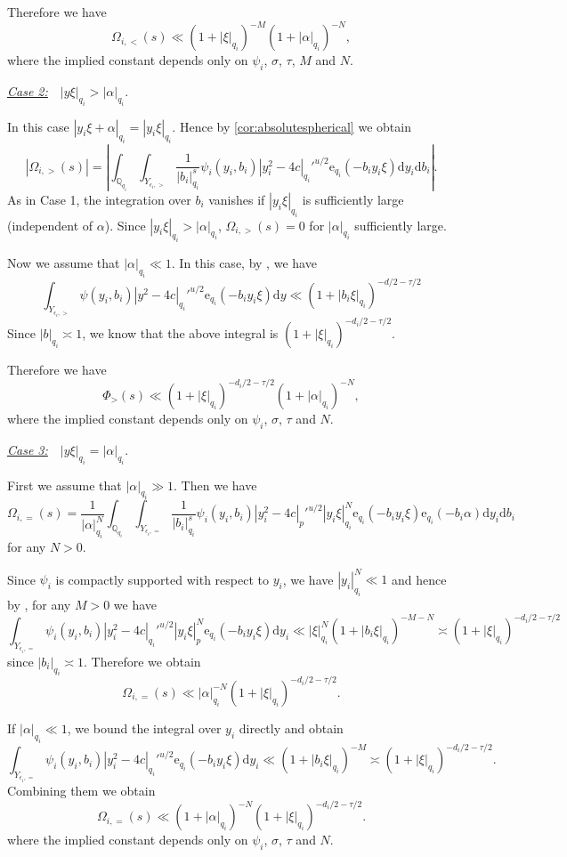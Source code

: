 \documentclass[10pt,oneside,reqno]{amsart}
\makeatletter
\newcommand\rmd{\mathrm{d}}
\newcommand\rme{\mathrm{e}}
\newcommand\QQ{\mathbb{Q}}
\theoremstyle{THEOREM}
\theoremstyle{DEFINITION}
\theoremstyle{EXERCISE}
\numberwithin{equation}{section}
\renewenvironment{proof}[1][\proofname]{\par
  \vspace{-6pt}
  \pushQED{\qed}
  \normalfont \topsep6\p@\@plus6\p@\relax
  \trivlist
  \item[\hskip\labelsep\rmfamily\bfseries
    #1\@addpunct{:}]\ignorespaces
}{
  \popQED\endtrivlist\@endpefalse
  \vspace{-6pt}
}
\newenvironment{insertproof}[1][\proofname]{\renewcommand\qedsymbol{$\blacksquare$}
  \par
  \vspace{-6pt}
  \pushQED{\qed}
  \normalfont \topsep6\p@\@plus6\p@\relax
  \trivlist
  \item[\hskip\labelsep\rmfamily\bfseries
    #1\@addpunct{:}]\ignorespaces
}{
  \popQED\endtrivlist\@endpefalse
  \vspace{-6pt}
}
\makeatother
\begin{document}
\begin{proof}
\begin{insertproof}
Therefore we have
\[
\Omega_{i,<}(s)\ll (1+|\xi|_{q_i})^{-M}(1+|\alpha|_{q_i})^{-N},
\]
where the implied constant depends only on $\psi_i$, $\sigma$, $\tau$, $M$ and $N$. 

\underline{\emph{Case 2:}}\ \ $|y\xi|_{q_i}>|\alpha|_{q_i}$.

In this case $|y_i\xi+\alpha|_{q_i}=|y_i\xi|_{q_i}$. Hence by \autoref{cor:absolutespherical} we obtain
\[
|\Omega_{i,>}(s)|=\left|\int_{\QQ_{q_i}}\int_{Y_{\epsilon_i,>}}\frac{1}{|b_i|_{q_i}^{s}} \psi_i(y_i,b_i)|y_i^2-4c|_{q_i}'^{u/2}\rme_{q_i}(-b_iy_i\xi)\rmd y_i\rmd b_i\right|.
\]
As in Case 1, the integration over $b_i$ vanishes if $|y_i\xi|_{q_i}$ is sufficiently large (independent of $\alpha$). Since $|y_i\xi|_{q_i}>|\alpha|_{q_i}$, $\Omega_{i,>}(s)=0$ for $|\alpha|_{q_i}$ sufficiently large. 

Now we assume that $|\alpha|_{q_i}\ll 1$. In this case, by \cite[Theorem A.5]{cheng2025b}, we have
\[
\int_{Y_{\epsilon_i,>}}\psi(y_i,b_i)|y^2-4c|_{q_i}'^{u/2}\rme_{q_i}(-b_iy_i\xi)\rmd y\ll (1+|b_i\xi|_{q_i})^{-d/2-\tau/2}
\]
Since $|b|_{q_i}\asymp 1$, we know that the above integral is $(1+|\xi|_{q_i})^{-d_i/2-\tau/2}$.

Therefore we have
\[
\Phi_>(s)\ll (1+|\xi|_{q_i})^{-d_i/2-\tau/2}(1+|\alpha|_{q_i})^{-N},
\]
where the implied constant depends only on $\psi_i$, $\sigma$, $\tau$ and $N$. 

\underline{\emph{Case 3:}}\ \ $|y\xi|_{q_i}=|\alpha|_{q_i}$.

First we assume that $|\alpha|_{q_i}\gg 1$. Then we have
\[
\Omega_{i,=}(s)=\frac{1}{|\alpha|_{q_i}^N}\int_{\QQ_{q_i}}\int_{Y_{\epsilon_i,=}} \frac{1}{|b_i|_{q_i}^s}\psi_i(y_i,b_i)|y_i^2-4c|_p'^{u/2} |y_i\xi|_{q_i}^N\rme_{q_i}(-b_iy_i\xi)\rme_{q_i}(-b_i\alpha)\rmd y_i\rmd b_i
\]
for any $N>0$.

Since $\psi_i$ is compactly supported with respect to $y_i$, we have $|y_i|_{q_i}^N\ll 1$ and hence by \cite[Theorem A.5]{cheng2025b}, for any $M>0$ we have
\[
\int_{Y_{\epsilon_i,=}}\psi_i(y_i,b_i)|y_i^2-4c|_{q_i}'^{u/2}|y_i\xi|_p^N\rme_{q_i}(-b_iy_i\xi)\rmd y_i\ll |\xi|_{q_i}^N(1+|b_i\xi|_{q_i})^{-M-N}\asymp (1+|\xi|_{q_i})^{-d_i/2-\tau/2}
\]
since $|b_i|_{q_i}\asymp 1$. Therefore we obtain
\[
\Omega_{i,=}(s)\ll |\alpha|_{q_i}^{-N}(1+|\xi|_{q_i})^{-d_i/2-\tau/2}.
\]

If $|\alpha|_{q_i}\ll 1$, we bound the integral over $y_i$ directly and obtain
\[
\int_{Y_{\epsilon_i,=}}\psi_i(y_i,b_i)|y_i^2-4c|_{q_i}'^{u/2}\rme_{q_i}(-b_iy_i\xi)\rmd y_i\ll (1+|b_i\xi|_{q_i})^{-M}\asymp (1+|\xi|_{q_i})^{-d_i/2-\tau/2}.
\]
Combining them we obtain 
\[
\Omega_{i,=}(s)\ll (1+|\alpha|_{q_i})^{-N}(1+|\xi|_{q_i})^{-d_i/2-\tau/2}.
\]
where the implied constant depends only on $\psi_i$, $\sigma$, $\tau$ and $N$.


\end{insertproof}
\end{proof}
\end{document}
